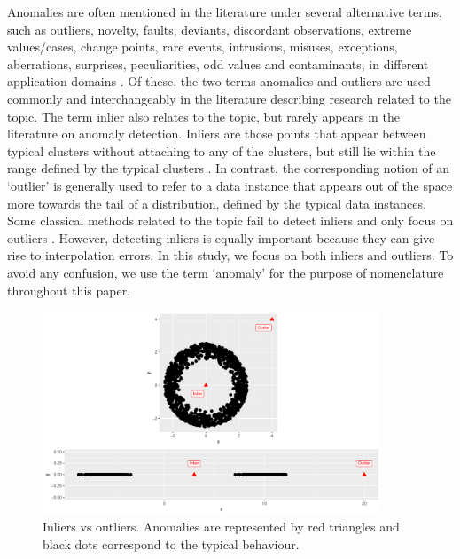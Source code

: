 \documentclass[11pt,a4paper,]{article}
\theoremstyle{definition}
\theoremstyle{definition}
\theoremstyle{definition}
\theoremstyle{remark}
\begin{document}
Anomalies are often mentioned in the literature under several alternative terms, such as outliers, novelty, faults, deviants, discordant observations, extreme values/cases, change points, rare events, intrusions, misuses, exceptions, aberrations, surprises, peculiarities, odd values and contaminants, in different application domains \autocite{Chandola2009wq,gupta2014outliersurvey,zhang2010improved}. Of these, the two terms anomalies and outliers are used commonly and interchangeably in the literature describing research related to the topic. The term inlier also relates to the topic, but rarely appears in the literature on anomaly detection. Inliers are those points that appear between typical clusters without attaching to any of the clusters, but still lie within the range defined by the typical clusters \autocite{jouan1999detection}. In contrast, the corresponding notion of an `outlier' is generally used to refer to a data instance that appears out of the space more towards the tail of a distribution, defined by the typical data instances. Some classical methods related to the topic fail to detect inliers and only focus on outliers \autocite{jouan1999detection}. However, detecting inliers is equally important because they can give rise to interpolation errors. In this study, we focus on both inliers and outliers. To avoid any confusion, we use the term `anomaly' for the purpose of nomenclature throughout this paper.

\begin{figure}[h]

{\centering \includegraphics[width=0.9\textwidth]{figure/outlierVsInlier-1} 

}

\caption{Inliers vs outliers. Anomalies are represented by red triangles and black dots correspond to the typical behaviour.}\label{fig:outlierVsInlier}
\end{figure}
\end{document}
